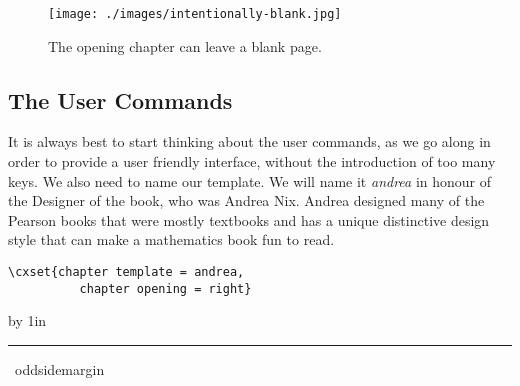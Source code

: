 \begin{figure}[htbp]
\texttt{[image: ./images/intentionally-blank.jpg]}
\caption{The opening chapter can leave a blank page. }
\label{fig:linear2}
\end{figure}

\subsection{The User Commands}

It is always best to start thinking about the user commands, as we go along in order to provide a user friendly
interface, without the introduction of too many keys. We also need to name our template. We will name it \emph{andrea} in honour of the Designer of the book, who was Andrea Nix. Andrea designed many of the Pearson books that were mostly textbooks and has a unique distinctive design style that can make a mathematics book fun to read.

\begin{verbatim}
\cxset{chapter template = andrea,
          chapter opening = right}
\end{verbatim}

\bgroup
\color{spot!50}
\makeatletter
\setlength\@tempdima\oddsidemargin
\advance \@tempdima by 1in

\hspace*{-1in}\rule{\pdfpagewidth}{3pt} 


\par\noindent

\the\pdfpagewidth \par
\the\@tempdima\par
\the\oddsidemargin\ oddsidemargin
\makeatother
\lorem

\lorem

